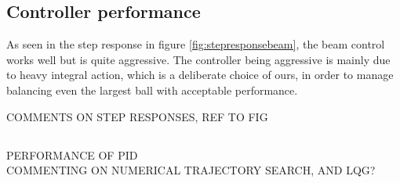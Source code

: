 
\subsection{Controller performance}
As seen in the step response in figure \ref{fig:stepresponsebeam}, the beam control works well but is quite aggressive.
The controller being aggressive is mainly due to heavy integral action, which is a deliberate choice of ours, in order to manage balancing even the largest ball with acceptable performance.

COMMENTS ON STEP RESPONSES, REF TO FIG \\

\subsection{}


PERFORMANCE OF PID \\
COMMENTING ON NUMERICAL TRAJECTORY SEARCH, AND LQG? \\
